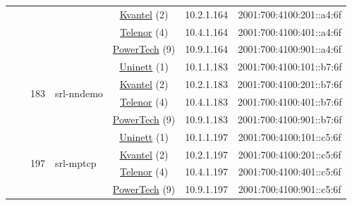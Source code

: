 \begin{small}
\begin{center}
\begin{longtable}{|c|c|c|c|c|c|c|c|}
  &  &  &  & \multicolumn{2}{|c|}{\tiny{\href{http://kvantel.no}{Kvantel} (2)}} & \tiny{10.2.1.164} & \tiny{2001:700:4100:201::a4:6f} \\* \cline{5-5}\cline{6-6}\cline{7-7}\cline{8-8}
  &  &  &  & \multicolumn{2}{|c|}{\tiny{\href{https://www.telenor.no}{Telenor} (4)}} & \tiny{10.4.1.164} & \tiny{2001:700:4100:401::a4:6f} \\* \cline{5-5}\cline{6-6}\cline{7-7}\cline{8-8}
  &  &  &  & \multicolumn{2}{|c|}{\tiny{\href{http://www.powertech.no}{PowerTech} (9)}} & \tiny{10.9.1.164} & \tiny{2001:700:4100:901::a4:6f} \\* \cline{3-3}\cline{4-4}\cline{5-5}\cline{6-6}\cline{7-7}\cline{8-8}
  &  & \multirow{4}{*}{\tiny{183}} & \multicolumn{1}{|l|}{\multirow{4}{*}{\tiny{srl-nndemo}}} & \multicolumn{2}{|c|}{\tiny{\href{https://www.uninett.no}{Uninett} (1)}} & \tiny{10.1.1.183} & \tiny{2001:700:4100:101::b7:6f} \\* \cline{5-5}\cline{6-6}\cline{7-7}\cline{8-8}
  &  &  &  & \multicolumn{2}{|c|}{\tiny{\href{http://kvantel.no}{Kvantel} (2)}} & \tiny{10.2.1.183} & \tiny{2001:700:4100:201::b7:6f} \\* \cline{5-5}\cline{6-6}\cline{7-7}\cline{8-8}
  &  &  &  & \multicolumn{2}{|c|}{\tiny{\href{https://www.telenor.no}{Telenor} (4)}} & \tiny{10.4.1.183} & \tiny{2001:700:4100:401::b7:6f} \\* \cline{5-5}\cline{6-6}\cline{7-7}\cline{8-8}
  &  &  &  & \multicolumn{2}{|c|}{\tiny{\href{http://www.powertech.no}{PowerTech} (9)}} & \tiny{10.9.1.183} & \tiny{2001:700:4100:901::b7:6f} \\* \cline{3-3}\cline{4-4}\cline{5-5}\cline{6-6}\cline{7-7}\cline{8-8}
  &  & \multirow{4}{*}{\tiny{197}} & \multicolumn{1}{|l|}{\multirow{4}{*}{\tiny{srl-mptcp}}} & \multicolumn{2}{|c|}{\tiny{\href{https://www.uninett.no}{Uninett} (1)}} & \tiny{10.1.1.197} & \tiny{2001:700:4100:101::c5:6f} \\* \cline{5-5}\cline{6-6}\cline{7-7}\cline{8-8}
  &  &  &  & \multicolumn{2}{|c|}{\tiny{\href{http://kvantel.no}{Kvantel} (2)}} & \tiny{10.2.1.197} & \tiny{2001:700:4100:201::c5:6f} \\* \cline{5-5}\cline{6-6}\cline{7-7}\cline{8-8}
  &  &  &  & \multicolumn{2}{|c|}{\tiny{\href{https://www.telenor.no}{Telenor} (4)}} & \tiny{10.4.1.197} & \tiny{2001:700:4100:401::c5:6f} \\* \cline{5-5}\cline{6-6}\cline{7-7}\cline{8-8}
  &  &  &  & \multicolumn{2}{|c|}{\tiny{\href{http://www.powertech.no}{PowerTech} (9)}} & \tiny{10.9.1.197} & \tiny{2001:700:4100:901::c5:6f} \\* \cline{3-3}\cline{4-4}\cline{5-5}\cline{6-6}\cline{7-7}\cline{8-8}

\end{longtable}
\end{center}
\end{small}
